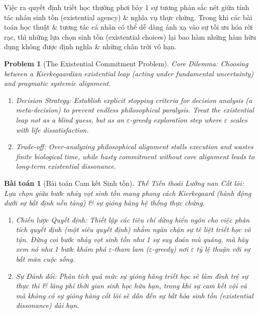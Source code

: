 \documentclass{article}
\newtheorem{problem}{Problem}
\newtheorem{baitoan}{Bài toán}
\begin{document}
Việc ra quyết định triết học thường phơi bày 1 sự tương phản sắc nét giữa tính tác nhân sinh tồn (existential agency) \& nghĩa vụ thực chứng. Trong khi các bài toán học thuật \& tương tác cá nhân có thể dễ dàng ánh xạ vào sự tối ưu hóa rời rạc, thì những lựa chọn sinh tồn (existential choices) lại bao hàm những hàm hữu dụng không được định nghĩa \& những chân trời vô hạn.

\begin{problem}[The Existential Commitment Problem]
	\emph{Core Dilemma:} Choosing between a Kierkegaardian existential leap \cite{kierkegaard1843fear} (acting under fundamental uncertainty) and pragmatic systemic alignment.
	\begin{enumerate}[label=(\roman*)]
		\item \emph{Decision Strategy:} Establish explicit stopping criteria for decision analysis (a meta-decision) to prevent endless philosophical paralysis. Treat the existential leap not as a blind guess, but as an $\varepsilon$-greedy exploration step where $\varepsilon$ scales with life dissatisfaction.
		\item \emph{Trade-off:} Over-analyzing philosophical alignment stalls execution and wastes finite biological time, while hasty commitment without core alignment leads to long-term existential dissonance.
	\end{enumerate}
\end{problem}
\begin{baitoan}[Bài toán Cam kết Sinh tồn]
	\emph{Thế Tiến thoái Lưỡng nan Cốt lõi:} Lựa chọn giữa bước nhảy vọt sinh tồn mang phong cách Kierkegaard \cite{kierkegaard1843fear} (hành động dưới sự bất định nền tảng) \& sự gióng hàng hệ thống thực chứng.
	\begin{enumerate}[label=(\roman*)]
		\item \emph{Chiến lược Quyết định:} Thiết lập các tiêu chí dừng hiển ngôn cho việc phân tích quyết định (một siêu quyết định) nhằm ngăn chặn sự tê liệt triết học vô tận. Đừng coi bước nhảy vọt sinh tồn như 1 sự suy đoán mù quáng, mà hãy xem nó như 1 bước khám phá $\varepsilon$-tham lam ($\varepsilon$-greedy) nơi $\varepsilon$ tỷ lệ thuận với sự bất mãn cuộc sống.
		\item \emph{Sự Đánh đổi:} Phân tích quá mức sự gióng hàng triết học sẽ làm đình trệ sự thực thi \& lãng phí thời gian sinh học hữu hạn, trong khi sự cam kết vội vã mà không có sự gióng hàng cốt lõi sẽ dẫn đến sự bất hòa sinh tồn (existential dissonance) dài hạn.
	\end{enumerate}
\end{baitoan}
\end{document}
